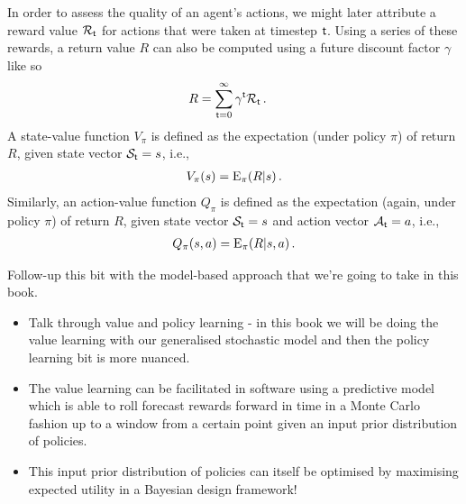 In order to assess the quality of an agent's actions, we might later attribute a reward value ${\cal R}_{{\sf t}}$ for actions that were taken at timestep ${\sf t}$. Using a series of these rewards, a return value $R$ can also be computed using a future discount factor $\gamma$ like so 
\begin{align}
R &= \sum_{{\sf t}=0}^\infty \gamma^{\sf t}{\cal R}_{\sf t} \,.
\end{align}
A state-value function $V_\pi$ is defined as the expectation (under policy $\pi$) of return $R$, given state vector ${\cal S}_{\sf t}=s$, i.e.,
\begin{align}
V_\pi (s) = {\rm E}_\pi (R\vert s) \,.
\end{align}
Similarly, an action-value function $Q_\pi$ is defined as the expectation (again, under policy $\pi$) of return $R$, given state vector ${\cal S}_{\sf t}=s$ and action vector ${\cal A}_{\sf t}=a$, i.e.,
\begin{align}
Q_\pi (s,a) = {\rm E}_\pi (R\vert s,a) \,.
\end{align}

Follow-up this bit with the model-based approach that we're going to take in this book.
\begin{itemize}
\item{Talk through value and policy learning - in this book we will be doing the value learning with our generalised stochastic model and then the policy learning bit is more nuanced.}
\item{The value learning can be facilitated in software using a predictive model which is able to roll forecast rewards forward in time in a Monte Carlo fashion up to a window from a certain point given an input prior distribution of policies.}
\item{This input prior distribution of policies can itself be optimised by maximising expected utility in a Bayesian design framework!}
\end{itemize}